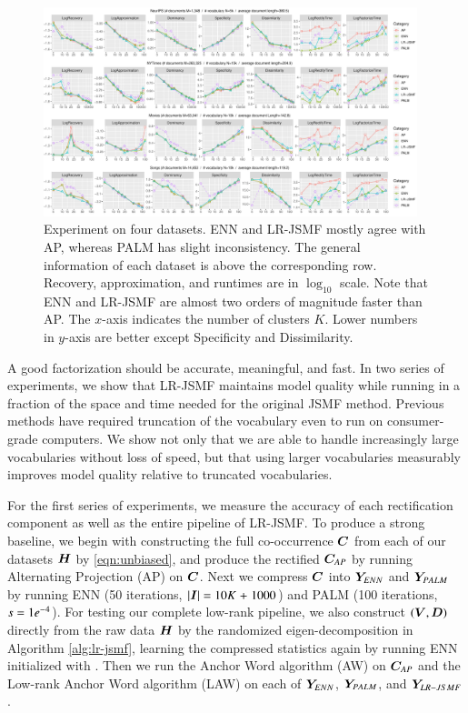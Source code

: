 \begin{figure}[ht]
 	\centering
	\includegraphics[width=0.97\textwidth, trim={1.0cm 1.0cm 1.0cm 0.0cm}]
	{./ch4/pics/real_MethodsPerTopics_new-plain.pdf}
	\caption{Experiment on four datasets. ENN and LR-JSMF mostly agree with AP,
	whereas PALM has slight inconsistency. The general information of each dataset
	is above the corresponding row. Recovery, approximation, and runtimes are in
	$\log_{10}$ scale. Note that ENN and LR-JSMF are almost two orders of
	magnitude faster than AP. The $x$-axis indicates the number of clusters $K$.
	Lower numbers in $y$-axis are better except Specificity and Dissimilarity.} 
	\label{fig:results-topics}
\end{figure}

A good factorization should be accurate, meaningful, and fast.
In two series of experiments, we show that LR-JSMF maintains model quality while
running in a fraction of the space and time needed for the original JSMF method.
Previous methods have required truncation of the vocabulary even to run on
consumer-grade computers. We show not only that we are able to handle
increasingly large vocabularies without loss of speed, but that using larger
vocabularies measurably improves model quality relative to truncated vocabularies.

For the first series of experiments, we measure the accuracy of each
rectification component as well as the entire pipeline of LR-JSMF. To produce a
strong baseline, we begin with constructing the full co-occurrence $\bm{C}$ from
each of our datasets $\bm{H}$ by \eqref{eqn:unbiased}, and produce the rectified
$\bm{C}_{AP}$ by running Alternating Projection (AP) on $\bm{C}$. Next we compress
$\bm{C}$ into $\bm{Y}_{ENN}$ and $\bm{Y}_{PALM}$ by running ENN (50 iterations, $|\bm{I}|\mathrel{=}
10K \mathrel{+} 1000$) and PALM (100 iterations, $s\mathrel{=}1e^{-4}$). For testing our
complete low-rank pipeline, we also construct $(\bm{V}, \bm{D})$ directly from the raw
data $\bm{H}$ by the randomized eigen-decomposition in Algorithm \ref{alg:lr-jsmf},
learning the compressed statistics  again by running ENN
initialized with \smash{$\BV \sqrt{\BD}$}. Then we run the Anchor Word algorithm
(AW) on $\bm{C}_{AP}$ and the Low-rank Anchor Word algorithm (LAW) on each of $\bm{Y}_
{ENN}$, $\bm{Y}_{PALM}$, and $\bm{Y}_{LR-JSMF}$.

